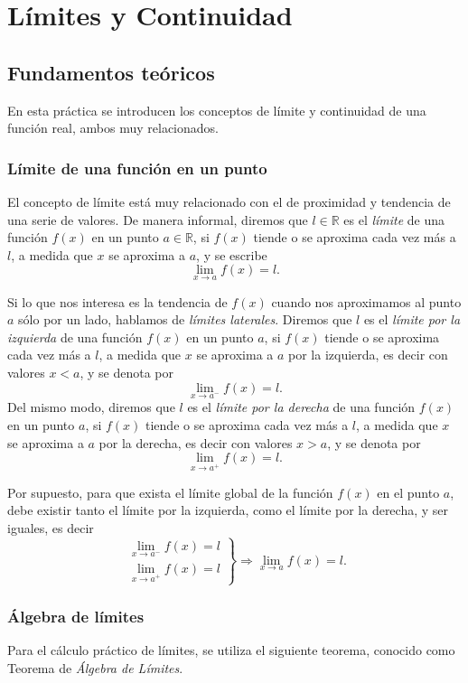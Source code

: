 \chapter{Límites y Continuidad}

\section{Fundamentos teóricos}
En esta práctica se introducen los conceptos de límite y continuidad de una función real, ambos muy relacionados.

\subsection{Límite de una función en un punto}
El concepto de límite está muy relacionado con el de proximidad y tendencia de una serie de valores. De manera informal, diremos que $l\in \mathbb{R}$ es el \emph{límite} de una función $f(x)$ en un punto $a\in \mathbb{R}$, si $f(x)$ tiende o se aproxima cada vez más a $l$, a medida que $x$ se aproxima a $a$, y se escribe
\[ \lim_{x\rightarrow a} f(x)=l.\]

Si lo que nos interesa es la tendencia de $f(x)$ cuando nos aproximamos al punto $a$ sólo por un lado, hablamos de \emph{límites laterales}. Diremos que $l$ es el \emph{límite por la izquierda} de una función $f(x)$ en un punto $a$, si $f(x)$ tiende o se aproxima cada vez más a $l$, a medida que $x$ se aproxima a $a$ por la izquierda, es decir con valores $x<a$, y se denota por
\[ \lim_{x\rightarrow a^-} f(x)=l.\]
Del mismo modo, diremos que $l$ es el \emph{límite por la derecha} de una función $f(x)$ en un punto $a$, si $f(x)$ tiende o se aproxima cada vez más a $l$, a medida que $x$ se aproxima a $a$ por la derecha, es decir con valores $x>a$, y se denota por
\[ \lim_{x\rightarrow a^+} f(x)=l.\]

Por supuesto, para que exista el límite global de la función $f(x)$ en el punto $a$, debe existir tanto el límite por la izquierda, como el límite por la derecha, y ser iguales, es decir
\[
\left.
\begin{array}{l}
\displaystyle \lim_{x\rightarrow a^-} f(x)=l \\
\displaystyle \lim_{x\rightarrow a^+} f(x)=l
\end{array}
\right\}
\Longrightarrow
\lim_{x\rightarrow a} f(x)=l.
\]

\subsection{Álgebra de límites}
Para el cálculo práctico de límites, se utiliza el siguiente
teorema, conocido como Teorema de \emph{Álgebra de Límites}.


